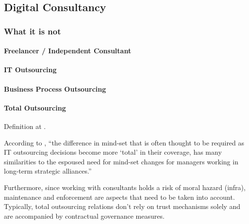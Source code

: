 \documentclass[12pt]{article}
\begin{document}
\hypertarget{digital-consultancy}{%
\subsection{Digital Consultancy}\label{digital-consultancy}}

\hypertarget{what-it-is-not}{%
\subsubsection{What it is not}\label{what-it-is-not}}

\hypertarget{section}{%
\paragraph{}\label{section}}

\hypertarget{freelancer-independent-consultant}{%
\paragraph{Freelancer / Independent
Consultant}\label{freelancer-independent-consultant}}

\hypertarget{it-outsourcing}{%
\paragraph{IT Outsourcing}\label{it-outsourcing}}

\hypertarget{business-process-outsourcing}{%
\paragraph{Business Process
Outsourcing}\label{business-process-outsourcing}}

\hypertarget{total-outsourcing}{%
\paragraph{Total Outsourcing}\label{total-outsourcing}}

Definition at \citet[67]{willcocks1995}.

According to \citet[70-71]{willcocks1995}, ``the difference in mind-set
that is often thought to be required as IT outsourcing decisions become
more `total' in their coverage, has many similarities to the espoused
need for mind-set changes for managers working in long-term strategic
alliances.''

Furthermore, since working with consultants holds a risk of moral hazard
(infra), maintenance and enforcement are aspects that need to be taken
into account. Typically, total outsourcing relations don't rely on trust
mechanisms solely and are accompanied by contractual governance
measures.
\end{document}
